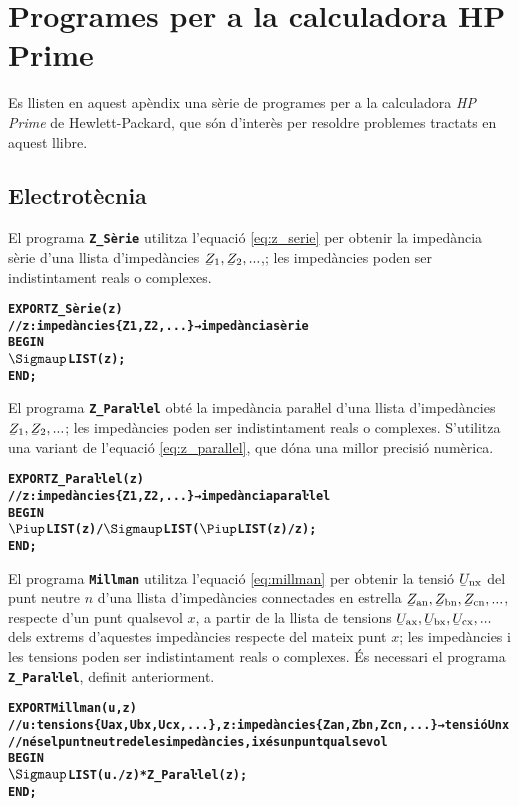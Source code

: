 \chapter{Programes per a la calculadora HP Prime}

Es llisten en aquest apèndix una sèrie de programes per a la calculadora \emph{HP Prime} de Hewlett-Packard, que són d'interès per resoldre problemes tractats en aquest llibre.


\section{Electrotècnia}\label{sec:HP_ELC}

El programa \texttt{\textbf{Z\_Sèrie}} utilitza l'equació \eqref{eq:z_serie} per obtenir la impedància sèrie d'una llista d'impedàncies $\cmplx{Z}_1, \cmplx{Z}_2, ...$,; les impedàncies poden ser indistintament reals o complexes.
\vspace{-6mm}
\begin{alltt}
\bfseries
{}
    EXPORT Z_Sèrie(z)
    // z:impedàncies \{Z1, Z2, ...\} → impedància sèrie
    BEGIN
      \(\Sigmaup\)LIST(z);
    END;
\end{alltt}

El programa \texttt{\textbf{Z\_Paraŀlel}} obté la impedància paraŀlel  d'una llista d'impedàncies $\cmplx{Z}_1, \cmplx{Z}_2, ...$; les impedàncies poden ser indistintament reals o complexes. S'utilitza una variant de l'equació \eqref{eq:z_parallel}, que dóna una millor precisió numèrica.
\vspace{-6mm}
\begin{alltt}
\bfseries
{}
    EXPORT Z_Paraŀlel(z)
    // z:impedàncies \{Z1, Z2, ...\} → impedància paraŀlel
    BEGIN
      \(\Piup\)LIST(z)/\(\Sigmaup\)LIST(\(\Piup\)LIST(z)/z);
    END;
\end{alltt}

El programa \texttt{\textbf{Millman}} utilitza l'equació \eqref{eq:millman} per obtenir la tensió $\cmplx{U}\ped{nx}$ del punt neutre $n$ d'una llista d'impedàncies connectades en estrella $\cmplx{Z}\ped{an}, \cmplx{Z}\ped{bn}, \cmplx{Z}\ped{cn}, ...$, respecte d'un punt qualsevol $x$, a partir de la llista de tensions $\cmplx{U}\ped{ax}, \cmplx{U}\ped{bx}, \cmplx{U}\ped{cx}, ...$ dels extrems d'aquestes impedàncies respecte del mateix punt $x$; les impedàncies i les tensions poden ser indistintament reals o complexes. És necessari el programa \texttt{\textbf{Z\_Paraŀlel}}, definit anteriorment.
\vspace{-6mm}
\begin{alltt}
\bfseries
{}
    EXPORT Millman(u,z)
    // u:tensions \{Uax,Ubx,Ucx,...\}, z:impedàncies \{Zan,Zbn,Zcn,...\} → tensió Unx
    // n és el punt neutre de les impedàncies, i x és un punt qualsevol
    BEGIN
      \(\Sigmaup\)LIST(u ./ z) * Z_Paraŀlel(z);
    END;
\end{alltt}


